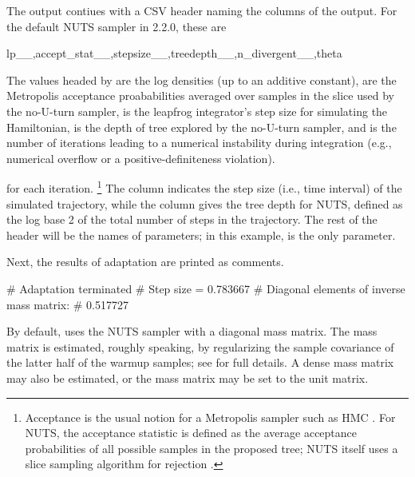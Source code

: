 \documentclass[article]{jss}
\begin{document}
The output contiues with a CSV header naming the columns of the
output. For the default NUTS sampler in  2.2.0, these are
%
\begin{Code}
lp__,accept_stat__,stepsize__,treedepth__,n_divergent__,theta
\end{Code}
%
The values headed by  are the log densities (up to an
additive constant),  are the Metropolis
acceptance proababilities averaged over samples in the slice used by
the no-U-turn sampler,  is the leapfrog
integrator's step size for simulating the Hamiltonian,
 is the depth of tree explored by the no-U-turn
sampler, and  is the number of iterations leading
to a numerical instability during integration (e.g., numerical
overflow or a positive-definiteness violation).

 for each iteration.%
%
\footnote{Acceptance is the usual notion for a Metropolis sampler such
  as HMC \citep{MetropolisEtAl:1953}.  For NUTS, the acceptance
  statistic is defined as the average acceptance probabilities of all
  possible samples in the proposed tree; NUTS itself uses a slice
  sampling algorithm for rejection \citep{Neal:2003, HoffmanGelman:2011}.}
%
The column  indicates the step size
(i.e., time interval) of the simulated trajectory, while the column 
 gives the tree depth for NUTS, defined as the 
log base 2 of the total number of steps in the trajectory.
The rest of the header will be the names of parameters; in this
example,  is the only parameter.

Next, the results of adaptation are printed as comments.
%
\begin{Code}
# Adaptation terminated
# Step size = 0.783667
# Diagonal elements of inverse mass matrix:
# 0.517727
\end{Code}
%
By default,  uses the NUTS sampler with a diagonal mass
matrix.  The mass matrix is estimated, roughly speaking, by
regularizing the sample covariance of the latter half of the warmup
samples; see \citep{Stan:2013} for full details.  A dense mass matrix
may also be estimated, or the mass matrix may be set to the unit matrix.
\end{document}
